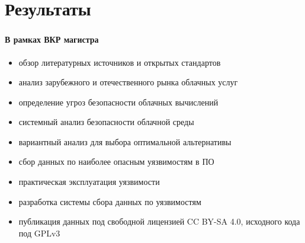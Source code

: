 \section{Результаты}

\begin{frame}
\frametitle{\insertsection}
\framesubtitle{В рамках ВКР магистра}

\begin{itemize}
    \item обзор литературных источников и открытых стандартов
    \item анализ зарубежного и отечественного рынка облачных услуг
    \item определение угроз безопасности облачных вычислений
    \item системный анализ безопасности облачной среды
    \item вариантный анализ для выбора оптимальной альтернативы
    \item сбор данных по наиболее опасным уязвимостям в ПО
    \item практическая эксплуатация уязвимости
    \item разработка системы сбора данных по уязвимостям
    \item публикация данных под свободной лицензией CC BY-SA 4.0, исходного кода под GPLv3
\end{itemize}
\end{frame}

